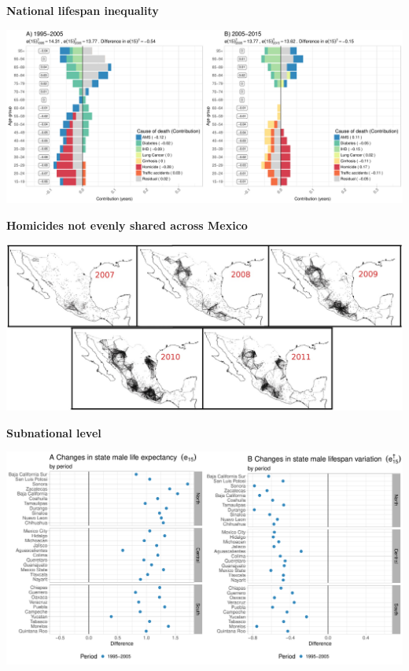 \documentclass[xcolor={dvipsnames}]{beamer}
\begin{document}
\begin{frame}
\begin{center}
\Large{\textbf{National lifespan inequality}}
\end{center}

\hspace*{-1cm}   
\includegraphics[scale=.31]{Figures/Figure_2}

\end{frame}

\begin{frame}
\begin{center}
\Large{\textbf{Homicides not evenly shared across Mexico}}
\end{center}

\hspace*{-1cm}   
\includegraphics[scale=.78]{Figures/map1}

\end{frame}

\begin{frame}
\begin{center}
\Large{\textbf{Subnational level}}
\end{center}

\hspace*{-1cm}   
\includegraphics[scale=.38]{Figures/Figure_3_1}

\end{frame}
\end{document}
